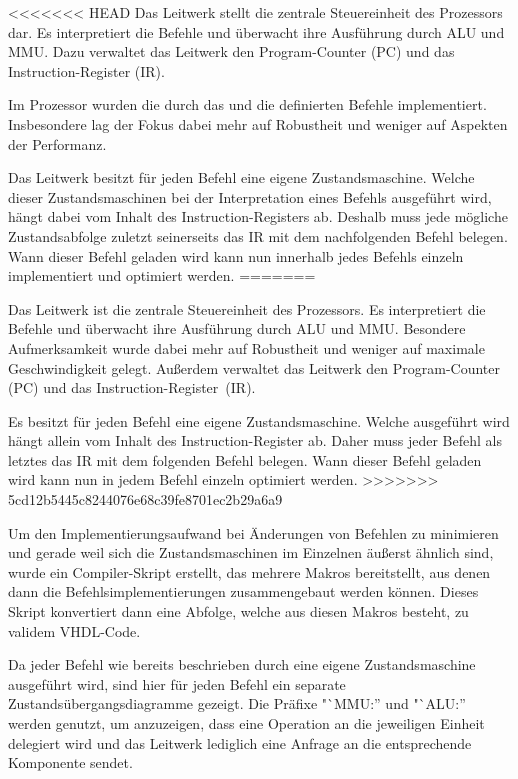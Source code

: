 <<<<<<< HEAD
Das Leitwerk stellt die zentrale Steuereinheit des Prozessors dar. Es interpretiert
die Befehle und \"uberwacht ihre Ausf\"uhrung durch ALU und MMU. Dazu verwaltet
das Leitwerk den Program-Counter (PC) und das Instruction-Register (IR).

Im Prozessor wurden die durch das 
und die  definierten Befehle implementiert. Insbesondere lag der Fokus dabei mehr auf Robustheit und
weniger auf Aspekten der Performanz.

Das Leitwerk besitzt f\"ur jeden Befehl eine eigene Zustandsmaschine. Welche dieser Zustandsmaschinen bei der Interpretation eines Befehls
ausgef\"uhrt wird, h\"angt dabei vom Inhalt des Instruction-Registers ab. Deshalb
muss jede m\"ogliche Zustandsabfolge zuletzt seinerseits das IR mit dem nachfolgenden Befehl belegen. Wann
dieser Befehl geladen wird kann nun innerhalb jedes Befehls einzeln implementiert und optimiert werden.
=======

Das Leitwerk ist die zentrale Steuereinheit des Prozessors. Es interpretiert
die Befehle und \"uberwacht ihre Ausf\"uhrung durch ALU und MMU. Besondere
Aufmerksamkeit wurde dabei mehr auf Robustheit und weniger auf maximale
Geschwindigkeit gelegt. Au\ss{}erdem verwaltet das Leitwerk den Program-Counter
(PC) und das Instruction-Register~(IR).

Es besitzt f\"ur jeden Befehl eine eigene Zustandsmaschine. Welche
ausgef\"uhrt wird h\"angt allein vom Inhalt des Instruction-Register ab. Daher
muss jeder Befehl als letztes das IR mit dem folgenden Befehl belegen. Wann
dieser Befehl geladen wird kann nun in jedem Befehl einzeln optimiert werden.
>>>>>>> 5cd12b5445c8244076e68c39fe8701ec2b29a6a9

Um den Implementierungsaufwand bei \"Anderungen von Befehlen zu minimieren und gerade weil sich die Zustandsmaschinen im Einzelnen \"au\ss{}erst \"ahnlich sind,
wurde ein Compiler-Skript erstellt, das mehrere Makros bereitstellt, aus denen
dann die Befehlsimplementierungen zusammengebaut werden k\"onnen. Dieses Skript konvertiert dann
eine Abfolge, welche aus diesen Makros besteht, zu validem VHDL-Code.

Da jeder Befehl wie bereits beschrieben durch eine eigene Zustandsmaschine ausgef\"uhrt wird, sind hier f\"ur jeden
Befehl ein separate Zustands\-\"uber\-gangs\-dia\-gramme gezeigt. Die Pr\"afixe
"`MMU:'' und "`ALU:'' werden genutzt, um anzuzeigen, dass eine Operation an die 
jeweiligen Einheit delegiert wird und das Leitwerk lediglich eine Anfrage an die entsprechende Komponente sendet.

